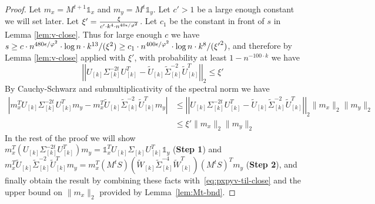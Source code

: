 \documentclass[letterpaper,11pt]{article}
\theoremstyle{plain}
\theoremstyle{definition}
\theoremstyle{remark}
\newcommand{\e}{\epsilon}
\newcommand{\mycolor}[1]{\textcolor{black}{#1}}
\begin{document}
\begin{proof}
Let $m_x=M^{t+1}\mathds{1}_{x}$ and $m_y=M^{t}\mathds{1}_{y}$.  Let $c'>1$ be a large enough constant we will set later. Let $\xi' = \frac{\xi}{c'\cdot \mycolor{k^4} \cdot n^{40 \e/\varphi^2}}$. Let $c_1$ be the constant in front of $s$ in Lemma  \ref{lem:v-close}. Thus for large enough $c$ we have $s\geq c
\cdot n^{480\epsilon / \varphi^2}\cdot \log n \cdot \mycolor{k^{13}}/({\xi}^2) \geq c_1\cdot n^{400\epsilon / \varphi^2}\cdot \log n \cdot \mycolor{k^8}/({\xi'}^2)$, and therefore by Lemma \ref{lem:v-close} applied with 
$\xi'$,  with probability at least $1-n^{-100\cdot k}$ we have
\[\left|\left|U_{[k]} {\Sigma}_{[k]}^{-2t} U_{[k]}^T - \widetilde{U}_{[k]} \widetilde{\Sigma}_{[k]}^{-2} \widetilde{U}_{[k]}^T \right|\right|_2\leq \xi' \]
By Cauchy-Schwarz and submultiplicativity of the spectral norm we have
\begin{align}
\left|m_x^T U_{[k]} {\Sigma}_{[k]}^{-2t} U_{[k]}^Tm_y - m_x^T\widetilde{U}_{[k]} \widetilde{\Sigma}_{[k]}^{-2} \widetilde{U}_{[k]}^T m_y \right| 
&\leq  \left|\left|U_{[k]} {\Sigma}_{[k]}^{-2t} U_{[k]}^T - \widetilde{U}_{[k]} \widetilde{\Sigma}_{[k]}^{-2} \widetilde{U}_{[k]}^T \right| \right|_2\|m_x\|_2\|m_y\|_2 \nonumber\\
&\leq \xi' \|m_x\|_2\|m_y\|_2\label{eq:pxpyv-til-close}
\end{align}
In the rest of the proof we will show $m_{x}^T (U_{[k]} {\Sigma}_{[k]}^{-2t} U_{[k]}^T)m_{y}=\mathds{1}_x^T U_{[k]}\Sigma_{[k]} U_{[k]}^T \mathds{1}_y$ ({\bf Step 1}) and $m_x^T  \widetilde{U}_{[k]}\widetilde{\Sigma}^{-2}_{[k]} \widetilde{U}_{[k]}^T m_y = m_x^T  (M^tS)(\widetilde{W}_{[k]} \widetilde{\Sigma}^{-4}_{[k]} \widetilde{W}^T_{[k]}) (M^tS)^T m_y $ ({\bf Step 2}), and finally obtain the result by combining these facts with~\eqref{eq:pxpyv-til-close} and the upper bound on $\|m_x\|_2$ provided by Lemma~\ref{lem:Mt-bnd}.


\end{proof}
\end{document}

